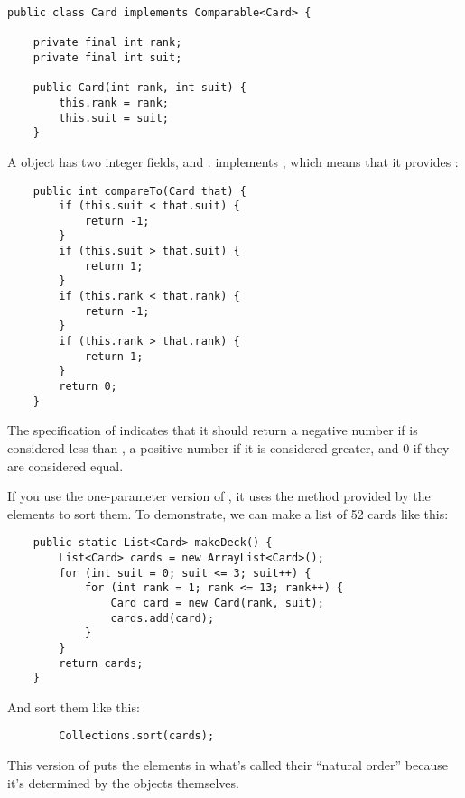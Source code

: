 \documentclass[12pt]{book}
\theoremstyle{exercise}
\begin{document}
\begin{verbatim}
public class Card implements Comparable<Card> {

    private final int rank;
    private final int suit;

    public Card(int rank, int suit) {
        this.rank = rank;
        this.suit = suit;
    }
\end{verbatim}

A  object has two integer fields,  and
.  implements
, which means that it
provides :

\begin{verbatim}
    public int compareTo(Card that) {
        if (this.suit < that.suit) {
            return -1;
        }
        if (this.suit > that.suit) {
            return 1;
        }
        if (this.rank < that.rank) {
            return -1;
        }
        if (this.rank > that.rank) {
            return 1;
        }
        return 0;
    }
\end{verbatim}


The specification of  indicates that it should return
a negative number if  is considered less than
, a positive number if it is considered greater, and 0 if
they are considered equal.

If you use the one-parameter version of , it
uses the  method provided by the elements to sort
them. To demonstrate, we can make a list of 52 cards like this:

\begin{verbatim}
    public static List<Card> makeDeck() {
        List<Card> cards = new ArrayList<Card>();
        for (int suit = 0; suit <= 3; suit++) {
            for (int rank = 1; rank <= 13; rank++) {
                Card card = new Card(rank, suit);
                cards.add(card);
            }
        }
        return cards;
    }
\end{verbatim}

And sort them like this:

\begin{verbatim}
        Collections.sort(cards);
\end{verbatim}

This version of  puts the elements in what's called their
``natural order'' because it's determined by the objects themselves.
\end{document}
